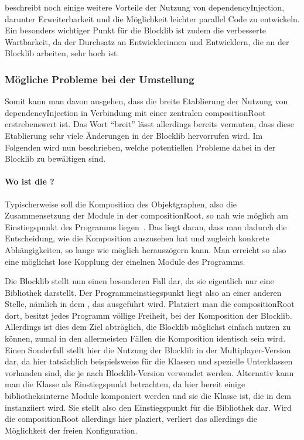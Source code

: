\textcite[S.~15~ff.]{Seemann2012} beschreibt noch einige weitere Vorteile der Nutzung von \gls{dependencyInjection}, darunter Erweiterbarkeit und die Möglichkeit leichter parallel Code zu entwickeln. Ein besonders wichtiger Punkt für die Blocklib ist zudem die verbesserte Wartbarkeit, da der Durchsatz an Entwicklerinnen und Entwicklern, die an der Blocklib arbeiten, sehr hoch ist.

\subsubsection{Mögliche Probleme bei der Umstellung}

Somit kann man davon ausgehen, dass die breite Etablierung der Nutzung von \gls{dependencyInjection} in Verbindung mit einer zentralen \gls{compositionRoot} erstrebenswert ist. Das Wort \enquote{breit} lässt allerdings bereits vermuten, dass diese Etablierung sehr viele Änderungen in der Blocklib hervorrufen wird. Im Folgenden wird nun beschrieben, welche potentiellen Probleme dabei in der Blocklib zu bewältigen sind.

\paragraph{Wo ist die ?}
Typischerweise soll die Komposition des Objektgraphen, also die Zusammensetzung der Module in der \gls{compositionRoot}, so nah wie möglich am Einstiegspunkt des Programms liegen~\cite[S.~232~ff.]{Martin17}\cite[S.~76~f.]{Seemann2012}. Das liegt daran, dass man dadurch die Entscheidung, wie die Komposition auszusehen hat und zugleich konkrete Abhängigkeiten, so lange wie möglich herauszögern kann. Man erreicht so also eine möglichst lose Kopplung der einelnen Module des Programms.

Die Blocklib stellt nun einen besonderen Fall dar, da sie eigentlich nur eine Bibliothek darstellt. Der Programmeinstiegspunkt liegt also an einer anderen Stelle, nämlich in dem , das ausgeführt wird. Platziert man die \gls{compositionRoot} dort, besitzt jedes Programm völlige Freiheit, bei der Komposition der Blocklib. Allerdings ist dies dem Ziel abträglich, die Blocklib möglichst einfach nutzen zu können, zumal in den allermeisten Fällen die Komposition identisch sein wird. Einen Sonderfall stellt hier die Nutzung der Blocklib in der Multiplayer-Version dar, da hier tatsächlich beispielsweise für die Klassen  und  spezielle Unterklassen vorhanden sind, die je nach Blocklib-Version verwendet werden. Alternativ kann man die Klasse  als Einstiegspunkt betrachten, da hier bereit einige bibliotheksinterne Module komponiert werden und sie die Klasse ist, die in dem  instanziiert wird. Sie stellt also den Einstiegspunkt für die Bibliothek dar. Wird die \gls{compositionRoot} allerdings hier plaziert, verliert das  allerdings die Möglichkeit der freien Konfiguration.

